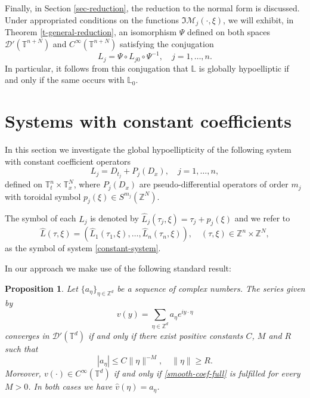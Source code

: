 \documentclass[12pt]{elsarticle}
\newtheorem{proposition}[theorem]{Proposition}
\numberwithin{equation}{section}
\begin{document}
Finally, in Section \ref{sec-reduction}, the reduction to the normal form is discussed. Under appropriated conditions on the functions $\Im\mathcal{M}_j(\cdot, \xi)$, we will exhibit, in Theorem \ref{t-general-reduction},  an isomorphism  $\Psi$ defined on both  spaces $\mathcal{D}'(\mathbb{T}^{n+N})$ and $C^{\infty}(\mathbb{T}^{n+N})$ satisfying  the conjugation
\begin{equation*}
L_j = \Psi \circ L_{j0} \circ  \Psi^{-1}, \quad j=1, \ldots, n.
\end{equation*}
In particular, it follows from this conjugation that  $\mathbb{L}$ is globally hypoelliptic if and only if the same occurs with $\mathbb{L}_0$.

\section{Systems with constant coefficients}\label{Systems with constant coefficients}

In this section we investigate the global hypoellipticity of the following system with constant coefficient operators
\begin{equation}\label{constant-system}
L_j = D_{t_j} + P_j(D_x), \quad j=1,\ldots,n,
\end{equation}
defined on $\mathbb{T}_t^n\times\mathbb{T}_x^N$, where $P_j(D_x)$ are pseudo-differential operators of order $m_j$  with toroidal symbol $p_j(\xi)\in S^{m_j}(\mathbb{Z}^N)$.

The symbol of each $L_j$ is denoted by $\widehat{L}_j(\tau_j,\xi) = \tau_j + p_j(\xi)$ and we refer to
$$
\widehat{L}(\tau, \xi) = (\widehat{L}_1(\tau_1,\xi), \ldots, \widehat{L}_n(\tau_n,\xi)), \quad (\tau, \xi) \in \mathbb{Z}^n \times \mathbb{Z}^N,
$$
as the symbol of system \eqref{constant-system}.

In our approach  we make use of the following standard result: 
\begin{proposition}\label{prop-smooth-const}
	Let $\{a_{\eta}\}_{\eta \in \mathbb{Z}^{d}}$ be a sequence of complex numbers. The series given by 
	\begin{equation*}
	v(y) =  \sum_{\eta \in \mathbb{Z}^{d}}{a_{\eta} e^{i  y \cdot \eta}}
	\end{equation*}
	 converges  in $\mathcal{D}'(\mathbb{T}^{d})$ if and only if there  exist positive constants $C$, $M$ and $R$ such that
	\begin{equation}\label{smooth-coef-full}
	|a_{\eta}| \leq C \|\eta\|^{-M}, \quad \|\eta\|\geq R.
	\end{equation}
	Moreover, $v(\cdot) \in C^{\infty}(\mathbb{T}^{d})$ if and only if  \eqref{smooth-coef-full} is fulfilled for every $M>0$. In both cases we have $\widehat{v}(\eta) = a_{\eta}$.
\end{proposition}
\end{document}
